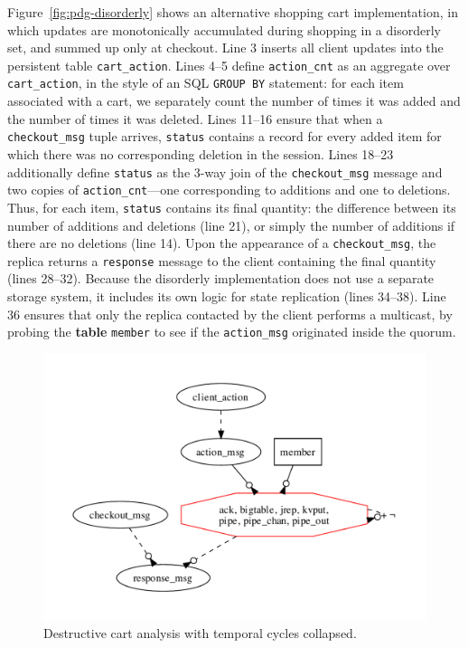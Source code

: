 Figure~\ref{fig:pdg-disorderly} shows an alternative shopping cart implementation, in which
updates are monotonically accumulated during shopping in a disorderly set, and summed up
only at checkout.  Line 3 inserts all client updates into the persistent table
\texttt{cart\_action}.  Lines 4--5 define \texttt{action\_cnt} as an aggregate
over \texttt{cart\_action}, in the style of an SQL \texttt{GROUP BY} statement: for each
item associated with a cart, we separately count the number of times it was
added and the number of times it was deleted.   
Lines 11--16 ensure that when a \texttt{checkout\_msg} tuple arrives, \texttt{status} 
contains a record for every added item
for which there was no corresponding deletion in the session.  Lines 18--23 
additionally define \texttt{status} as the 3-way join of the \texttt{checkout\_msg}
message and two copies of \texttt{action\_cnt}---one corresponding to additions and one to
deletions.
Thus, for each item, \texttt{status} contains its final quantity: the
difference between its number of additions and deletions (line 21), or simply the number
of additions if there are no deletions (line 14). 
Upon the appearance of a \texttt{checkout\_msg}, the
replica returns a \texttt{response} message to the client containing the
final quantity (lines 28--32).  
Because the disorderly implementation does not use a separate
storage system, it includes its own logic for state replication (lines 34--38).
Line 36 ensures that only the replica contacted by the client performs a multicast,
by probing the \textbf{table} \texttt{member} to see if the \texttt{action\_msg} 
originated inside the quorum.

\begin{figure}[t]
\centering
\includegraphics[width=0.9\linewidth]{fig/destructive.pdf}
\vspace{-10pt}
\caption{Destructive cart analysis with temporal cycles collapsed.}
\label{fig:pdg-destructive-analysis}
\vspace{-2pt}
\end{figure}

